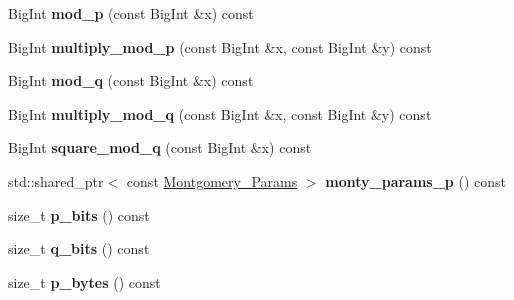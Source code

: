 \begin{DoxyCompactItemize}
\mbox{\label{class_botan_1_1_d_l___group___data_a0c1be91431eec2eed935da3b6b22ed8e}} 
Big\+Int {\bfseries mod\+\_\+p} (const Big\+Int \&x) const
\item 
\mbox{\label{class_botan_1_1_d_l___group___data_ab75be85cf118ceeb456a828b680ce667}} 
Big\+Int {\bfseries multiply\+\_\+mod\+\_\+p} (const Big\+Int \&x, const Big\+Int \&y) const
\item 
\mbox{\label{class_botan_1_1_d_l___group___data_a5b885de6ba76c44d141dab563ae2bfb1}} 
Big\+Int {\bfseries mod\+\_\+q} (const Big\+Int \&x) const
\item 
\mbox{\label{class_botan_1_1_d_l___group___data_ae5a973ede0114ded739171679c373dfb}} 
Big\+Int {\bfseries multiply\+\_\+mod\+\_\+q} (const Big\+Int \&x, const Big\+Int \&y) const
\item 
\mbox{\label{class_botan_1_1_d_l___group___data_a117aeced2481bbc36dbbe59292286862}} 
Big\+Int {\bfseries square\+\_\+mod\+\_\+q} (const Big\+Int \&x) const
\item 
\mbox{\label{class_botan_1_1_d_l___group___data_aa9c2d5d519989d61b16b1947424db0ac}} 
std\+::shared\+\_\+ptr$<$ const \mbox{\hyperlink{class_botan_1_1_montgomery___params}{Montgomery\+\_\+\+Params}} $>$ {\bfseries monty\+\_\+params\+\_\+p} () const
\item 
\mbox{\label{class_botan_1_1_d_l___group___data_a815bb8713c3b185e52f3b14772be338e}} 
size\+\_\+t {\bfseries p\+\_\+bits} () const
\item 
\mbox{\label{class_botan_1_1_d_l___group___data_a606b459bb9cebf0fefd01612e4e2bfa2}} 
size\+\_\+t {\bfseries q\+\_\+bits} () const
\item 
\mbox{\label{class_botan_1_1_d_l___group___data_ade079ac31c0dbde5c1d6ffd27e01b68a}} 
size\+\_\+t {\bfseries p\+\_\+bytes} () const
\item 

\end{DoxyCompactItemize}
